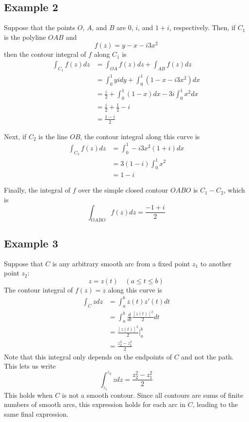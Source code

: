 \documentclass{article}
\begin{document}
\subsection{Example 2}
Suppose that the points $O$, $A$, and $B$ are $0$, $i$, and $1 + i$, respectively. Then, if $C_1$ is the polyline $OAB$ and
\[
	f(z) = y - x - i3x^2
\]
then the contour integral of $f$ along $C_1$ is
\begin{align*}
	\int_{C_1} f(z) dz
	&= \int_{OA} f(z) dz + \int_{AB} f(z) dz \\
	&= \int_0^1 yi dy + \int_0^1 (1 - x - i3x^2) dx \\
	&= \frac{i}{2} + \int_0^1 (1 - x)dx - 3i\int_0^1 x^2 dx \\
	&= \frac{i}{2} + \frac{1}{2} - i \\
	&= \frac{1 - i}{2}
\end{align*}

Next, if $C_2$ is the line $OB$, the contour integral along this curve is
\begin{align*}
	\int_{C_2} f(z) dz 
	&= \int_0^1 -i3x^2(1 + i)dx \\
	&= 3(1 - i) \int_0^1 x^2 \\
	&= 1 - i
\end{align*}

Finally, the integral of $f$ over the simple closed contour $OABO$ is $C_1 - C_2$, which is
\[
	\int_{OABO} f(z) dz = \frac{-1 + i}{2}
\]

\subsection{Example 3}
Suppose that $C$ is any arbitrary smooth arc from a fixed point $z_1$ to another point $z_2$:
\[
	z = z(t)	\quad (a \le t \le b)
\]
The contour integral of $f(z) = z$ along this curve is
\begin{align*}
	\int_C z dz 
	&= \int_a^b z(t) z'(t) dt \\
	&= \int_a^b \frac{d}{dt} \frac{[z(t)]^2}{2} dt \\
	&= \frac{[z(t)]^2}{2} \Big|_a^b \\
	&= \frac{z_2^2 - z_1^2}{2}
\end{align*}
Note that this integral only depends on the endpoints of $C$ and not the path. This lets us write
\[
	\int_{z_1}^{z_2} z dz = \frac{z_2^2 - z_1^2}{2}
\]
This holds when $C$ is not a smooth contour. Since all contours are sums of finite numbers of smooth arcs, this expression holds for each arc in $C$, leading to the same final expression.
\end{document}
